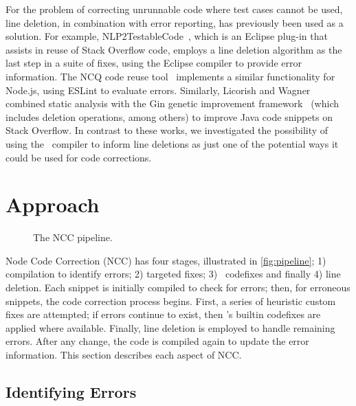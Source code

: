 \documentclass[conference]{IEEEtran}
\begin{document}
For the problem of correcting unrunnable code where test cases cannot be used, line deletion, in combination with error reporting, has previously been used as a solution. For example, NLP2TestableCode~\cite{reidnlp2tc}, which is an Eclipse plug-in that assists in reuse of Stack Overflow code, employs a line deletion algorithm as the last step in a suite of fixes, using the Eclipse compiler to provide error information. The NCQ code reuse tool~\cite{reidNCQ} implements a similar functionality for Node.js, using ESLint to evaluate errors. 
Similarly, Licorish and Wagner~\cite{10.1145/3520304.3528772} combined static analysis with the Gin genetic improvement framework~\cite{10.1145/3321707.3321841} (which includes deletion operations, among others) to improve Java code snippets on Stack Overflow. In contrast to these works, we investigated the possibility of using the \ts\ compiler to inform line deletions as just one of the potential ways it could be used for code corrections.

\section{Approach}

\begin{figure}[h]
\centering

\caption{The NCC pipeline.}
\label{fig:pipeline}
\end{figure}

Node Code Correction (NCC) has four stages, illustrated in \autoref{fig:pipeline}; 1) compilation to identify errors; 2) targeted fixes; 3) \ts\ codefixes and finally 4) line deletion. Each snippet is initially compiled to check for errors; then, for erroneous snippets, the code correction process begins. First, a series of heuristic custom fixes are attempted; if errors continue to exist, then \ts{}'s builtin codefixes are applied where available. Finally, line deletion is employed to handle remaining errors. After any change, the code is compiled again to update the error information. This section describes each aspect of NCC.

\subsection{Identifying Errors}
\end{document}
